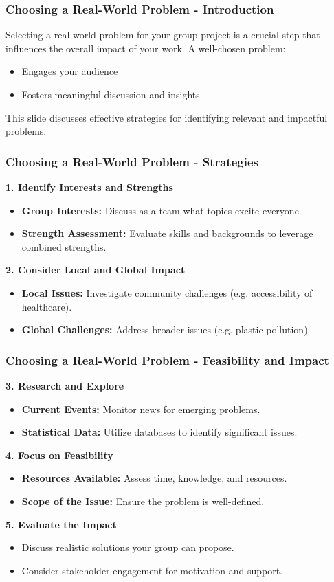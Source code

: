 \documentclass[aspectratio=169]{beamer}
\begin{document}
\begin{frame}[fragile]
    \frametitle{Choosing a Real-World Problem - Introduction}
    Selecting a real-world problem for your group project is a crucial step that influences the overall impact of your work. A well-chosen problem:
    \begin{itemize}
        \item Engages your audience
        \item Fosters meaningful discussion and insights
    \end{itemize}
    This slide discusses effective strategies for identifying relevant and impactful problems.
\end{frame}

\begin{frame}[fragile]
    \frametitle{Choosing a Real-World Problem - Strategies}
    \textbf{1. Identify Interests and Strengths}
    \begin{itemize}
        \item \textbf{Group Interests:} Discuss as a team what topics excite everyone.
        \item \textbf{Strength Assessment:} Evaluate skills and backgrounds to leverage combined strengths.
    \end{itemize}
    
    \textbf{2. Consider Local and Global Impact}
    \begin{itemize}
        \item \textbf{Local Issues:} Investigate community challenges (e.g. accessibility of healthcare).
        \item \textbf{Global Challenges:} Address broader issues (e.g. plastic pollution).
    \end{itemize}
\end{frame}

\begin{frame}[fragile]
    \frametitle{Choosing a Real-World Problem - Feasibility and Impact}
    \textbf{3. Research and Explore}
    \begin{itemize}
        \item \textbf{Current Events:} Monitor news for emerging problems.
        \item \textbf{Statistical Data:} Utilize databases to identify significant issues.
    \end{itemize}
    
    \textbf{4. Focus on Feasibility}
    \begin{itemize}
        \item \textbf{Resources Available:} Assess time, knowledge, and resources.
        \item \textbf{Scope of the Issue:} Ensure the problem is well-defined.
    \end{itemize}

    \textbf{5. Evaluate the Impact}
    \begin{itemize}
        \item Discuss realistic solutions your group can propose.
        \item Consider stakeholder engagement for motivation and support.
    \end{itemize}
\end{frame}
\end{document}
